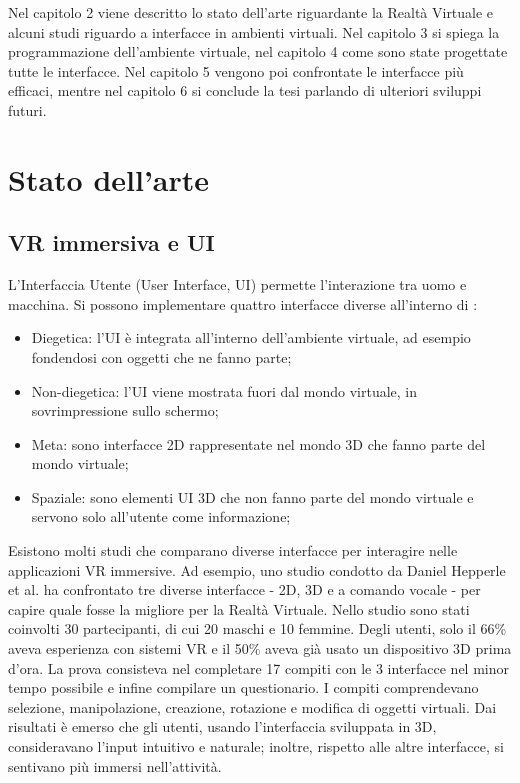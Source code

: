 \documentclass[target=bach,aauheader=]{thud}
\begin{document}
Nel capitolo 2 viene descritto lo stato dell'arte riguardante la Realtà Virtuale e alcuni studi riguardo a interfacce in ambienti virtuali.
Nel capitolo 3 si spiega la programmazione dell'ambiente virtuale, nel capitolo 4 come sono state progettate tutte le interfacce.
Nel capitolo 5 vengono poi confrontate le interfacce più efficaci, mentre nel capitolo 6 si conclude la tesi parlando di ulteriori sviluppi futuri.


\chapter{Stato dell'arte} %
\section{VR immersiva e UI}
L'Interfaccia Utente (User Interface, UI) permette l'interazione tra uomo e macchina.
Si possono implementare quattro interfacce diverse all'interno di :
\begin{itemize}
    \item Diegetica: l'UI è integrata all'interno dell'ambiente virtuale, ad esempio fondendosi con oggetti che ne fanno parte;
    \item Non-diegetica: l'UI viene mostrata fuori dal mondo virtuale, in sovrimpressione sullo schermo;
    \item Meta: sono interfacce 2D rappresentate nel mondo 3D che fanno parte del mondo virtuale;
    \item Spaziale: sono elementi UI 3D che non fanno parte del mondo virtuale e servono solo all'utente come informazione;
\end{itemize} 

Esistono molti studi che comparano diverse interfacce per interagire nelle applicazioni VR immersive.
Ad esempio, uno studio condotto da Daniel Hepperle et al.\cite{Hepperle} ha confrontato tre diverse interfacce - 2D, 3D e a comando vocale - per capire quale fosse la migliore per la Realtà Virtuale.  
Nello studio sono stati coinvolti 30 partecipanti, di cui 20 maschi e 10 femmine.
Degli utenti, solo il 66\% aveva esperienza con sistemi VR e il 50\% aveva già usato un dispositivo 3D prima d'ora.
La prova consisteva nel completare 17 compiti con le 3 interfacce nel minor tempo possibile e infine compilare un questionario.
I compiti comprendevano selezione, manipolazione, creazione, rotazione e modifica di oggetti virtuali.
Dai risultati è emerso che gli utenti, usando l'interfaccia sviluppata in 3D, consideravano l'input intuitivo e naturale; inoltre, rispetto alle altre interfacce, si sentivano più immersi nell'attività. \\
\end{document}
